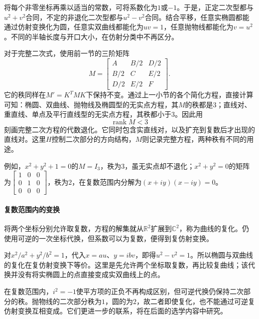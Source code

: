 将每个非零坐标再乘以适当的常数，可将系数化为\(1\)或\(-1\)。于是，正定二次型都与\(u^2+v^2\)合同，不定的非退化二次型都与\(u^2-v^2\)合同。结合平移，任意实椭圆都能通过仿射变换化为圆，任意实双曲线都能化为\(uv=1\)，任意抛物线都能化为\(v=u^2\)。不同的半轴长度与开口大小，在仿射分类中不再区分。

对于完整二次式，使用前一节的三阶矩阵
\begin{equation*}
    M=\left[\begin{matrix}A&B/2&D/2\\B/2&C&E/2\\D/2&E/2&F\end{matrix}\right] .
\end{equation*}
它的秩同样在\(M'=K^TMK\)下保持不变。通过上一小节的各个简化方程，直接计算可知：椭圆、双曲线、抛物线及椭圆型的无实点方程，其\(M\)的秩都是\(3\)；直线对、重直线、单点及平行直线型的无实点方程，其秩都小于\(3\)。因此用
\begin{equation}\label{eq:quadratic-degenerate-rank}
    \operatorname{rank}M<3
\end{equation}
刻画完整二次方程的{\heiti{}代数退化}。它同时包含实直线对，以及扩充到复数后才出现的直线对。这里\(H\)控制二次部分的方向结构，\(M\)则记录完整方程，两种秩有不同的用途。

例如，\(x^2+y^2+1=0\)的\(M=I_3\)，秩为\(3\)，虽无实点却不退化；\(x^2+y^2=0\)的矩阵为\(\left[\begin{smallmatrix}1&0&0\\0&1&0\\0&0&0\end{smallmatrix}\right]\)，秩为\(2\)，在复数范围内分解为\((x+iy)(x-iy)=0\)。
\newpage
\paragraph{复数范围内的变换} \mbox{}

将两个坐标分别允许取复数，方程的解集就从\(\mathbb R^2\)扩展到\(\mathbb C^2\)，称为曲线的{\heiti{}复化}。仍使用可逆的一次坐标代换，但系数可以为复数，便得到复仿射变换。

对\(x^2/a^2+y^2/b^2=1\)，代入\(x=au\)、\(y=ibv\)，即得\(u^2-v^2=1\)。所以椭圆与双曲线的复化在复仿射变换下等价。这里是先允许两个坐标取复数，再比较复曲线；该代换并没有将实椭圆上的点直接变成实双曲线上的点。

在复数范围内，\(i^2=-1\)使平方项的正负不再构成区别，但可逆代换仍保持二次部分的秩。抛物线的二次部分秩为\(1\)，圆的为\(2\)，故二者即使复化，也不能通过可逆复仿射变换互相变成。它们更进一步的联系，将在后面的选学内容中研究。

